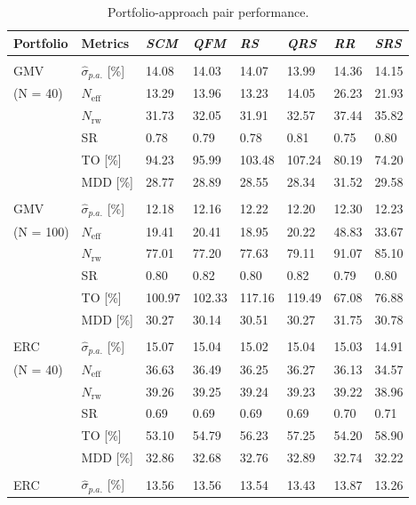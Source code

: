 \documentclass[a4paper,11pt,nocenter,bold,noupper,headcount]{mythesis}
\theoremstyle{plain}
\theoremstyle{definition}
\begin{document}
\begin{table} [H]  \footnotesize
\caption{Portfolio-approach pair performance.}
\centering
\label{test_perform}
\begin{tabular}{p{1.3cm}p{1.4cm}P{1.2cm}P{1.2cm}P{1.2cm}P{1.2cm}P{1.2cm}P{1.2cm}} 
\hline 
\textbf{Portfolio }& \textbf{Metrics} &\textit{SCM}&\textit{QFM}&\textit{RS}&\textit{QRS}&\textit{RR}& \textit{SRS} \\
\hline
& &&&&&&\\
GMV   & $\hat{\sigma}_{p.a.}$  [\%] & 14.08 & 14.03 & 14.07 & 13.99 & 14.36 & 14.15\\
(N = 40) & $N_{\text{eff}}$&13.29 & 13.96 & 13.23 & 14.05 & 26.23 & 21.93\\
& $N_{\text{rw}}$&31.73 & 32.05 & 31.91 & 32.57 & 37.44 & 35.82\\
& SR &0.78 & 0.79 & 0.78 & 0.81 & 0.75 & 0.80  \\
&   TO [\%] &94.23 & 95.99 & 103.48 & 107.24 & 80.19 & 74.20\\
&  MDD [\%] & 28.77 & 28.89 & 28.55 & 28.34 & 31.52 & 29.58\\
&\\
GMV   & $\hat{\sigma}_{p.a.}$ [\%]&12.18 & 12.16 & 12.22 & 12.20 & 12.30 & 12.23\\
(N = 100) & $N_{\text{eff}}$&19.41 & 20.41 & 18.95 & 20.22 & 48.83 & 33.67\\
& $N_{\text{rw}}$&77.01 & 77.20 & 77.63 & 79.11 & 91.07 & 85.10\\
& SR &0.80 & 0.82 & 0.80 & 0.82 & 0.79 & 0.80\\
&   TO [\%]&100.97 & 102.33 & 117.16 & 119.49 & 67.08 & 76.88\\
&  MDD [\%]&30.27 & 30.14 & 30.51 & 30.27 & 31.75 & 30.78 \\
&\\
ERC   & $\hat{\sigma}_{p.a.}$ [\%]&15.07 & 15.04 & 15.02 & 15.04 & 15.03 & 14.91\\
(N = 40) & $N_{\text{eff}}$&36.63 & 36.49 & 36.25 & 36.27 & 36.13 & 34.57\\
& $N_{\text{rw}}$&39.26 & 39.25 & 39.24 & 39.23 & 39.22 & 38.96\\
& SR &0.69 & 0.69 & 0.69 & 0.69 & 0.70 & 0.71\\
&   TO [\%] &53.10 & 54.79 & 56.23 & 57.25 & 54.20 & 58.90\\
&  MDD [\%]&32.86 & 32.68 & 32.76 & 32.89 & 32.74 & 32.22\\
&\\
ERC   & $\hat{\sigma}_{p.a.}$ [\%]&13.56 & 13.56 & 13.54 & 13.43 & 13.87 & 13.26\\

\end{tabular}
\end{table}
\end{document}
